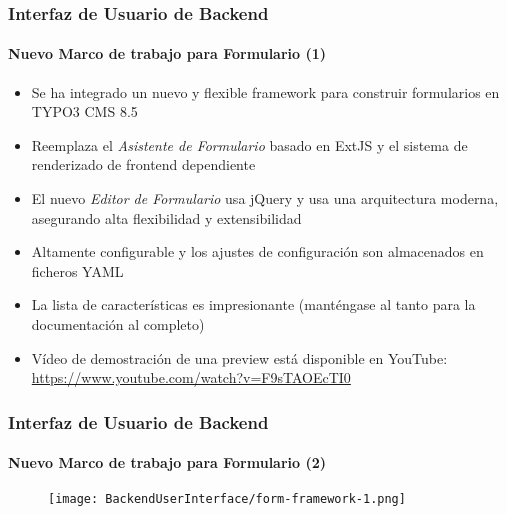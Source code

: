 \begin{frame}[fragile]
	\frametitle{Interfaz de Usuario de Backend}
	\framesubtitle{Nuevo Marco de trabajo para Formulario (1)}

	\begin{itemize}
		\item Se ha integrado un nuevo y flexible framework para construir formularios en TYPO3 CMS 8.5
		\item Reemplaza el \textit{Asistente de Formulario} basado en ExtJS y el sistema de renderizado de frontend dependiente
		\item El nuevo \textit{Editor de Formulario} usa jQuery y usa una arquitectura moderna,
			asegurando alta flexibilidad y extensibilidad
		\item Altamente configurable y los ajustes de configuración son almacenados en ficheros YAML
		\item La lista de características es impresionante\newline
			\small(manténgase al tanto para la documentación al completo)\normalsize
		\item Vídeo de demostración de una preview está disponible en YouTube:\newline
			\url{https://www.youtube.com/watch?v=F9sTAOEcTI0}
	\end{itemize}

\end{frame}
\begin{frame}[fragile]
	\frametitle{Interfaz de Usuario de Backend}
	\framesubtitle{Nuevo Marco de trabajo para Formulario (2)}

	\begin{figure}
		\texttt{[image: BackendUserInterface/form-framework-1.png]}
	\end{figure}

\end{frame}

